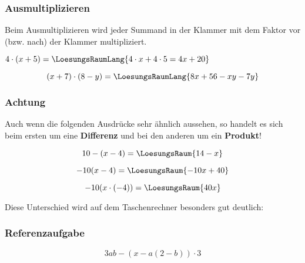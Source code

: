 \subsubsection{Ausmultiplizieren}
Beim Ausmultiplizieren wird jeder Summand in der Klammer mit dem
Faktor vor (bzw. nach) der Klammer multipliziert.
\begin{beispiel}{}{}

  $4\cdot (x + 5) =\LoesungsRaumLang{4\cdot x + 4\cdot 5 = 4x + 20}$
\end{beispiel}

\begin{beispiel}{}{}
\TRAINER{\\}
  $$(x + 7)\cdot(8-y) = \LoesungsRaumLang{8x+56-xy-7y}$$

\end{beispiel}

\newpage

\subsubsection{Achtung}
Auch wenn die folgenden Ausdrücke sehr ähnlich aussehen, so
handelt es sich beim ersten um eine \textbf{Differenz} und bei den anderen um
ein \textbf{Produkt}!

$$10-(x-4) =\LoesungsRaum{14-x}$$

$$-10(x-4) = \LoesungsRaum{-10x + 40}$$

$$-10(x\cdot{}(-4)) = \LoesungsRaum{40x}$$

Diese Unterschied wird auf dem Taschenrechner besonders gut deutlich:

    

\vspace{3mm}
   


\subsubsection{Referenzaufgabe}
$$3ab-(x-a(2-b))\cdot{}3$$

